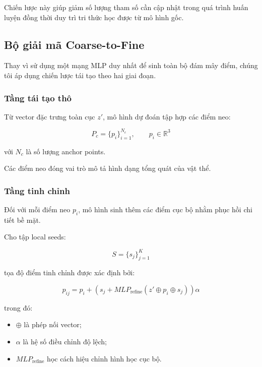 \documentclass[conference,a4paper]{IEEEtran}
\begin{document}
Chiến lược này giúp giảm số lượng tham số cần cập nhật trong quá trình huấn luyện đồng thời duy trì tri thức học được từ mô hình gốc.

\subsection{Bộ giải mã Coarse-to-Fine}

Thay vì sử dụng một mạng MLP duy nhất để sinh toàn bộ đám mây điểm, chúng tôi áp dụng chiến lược tái tạo theo hai giai đoạn.

\subsubsection{Tầng tái tạo thô}

Từ vector đặc trưng toàn cục $z'$, mô hình dự đoán tập hợp các điểm neo:

\begin{equation}
P_c =
\{p_i\}_{i=1}^{N_c},
\qquad
p_i \in \mathbb{R}^{3}
\end{equation}

với $N_c$ là số lượng anchor points.

Các điểm neo đóng vai trò mô tả hình dạng tổng quát của vật thể.

\subsubsection{Tầng tinh chỉnh}

Đối với mỗi điểm neo $p_i$, mô hình sinh thêm các điểm cục bộ nhằm phục hồi chi tiết bề mặt.

Cho tập local seeds:

\begin{equation}
S =
\{s_j\}_{j=1}^{K}
\end{equation}

tọa độ điểm tinh chỉnh được xác định bởi:

\begin{equation}
p_{ij}
=
p_i
+
\left(
s_j
+
MLP_{\text{refine}}
(
z' \oplus p_i \oplus s_j
)
\right)
\alpha
\end{equation}

trong đó:

\begin{itemize}
    \item $\oplus$ là phép nối vector;
    \item $\alpha$ là hệ số điều chỉnh độ lệch;
    \item $MLP_{\text{refine}}$ học cách hiệu chỉnh hình học cục bộ.
\end{itemize}
\end{document}
